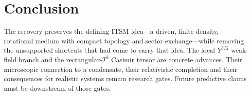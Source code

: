 \documentclass[11pt]{article}
\newcommand{\Tthree}{T^3}
\begin{document}
\section*{Conclusion}

The recovery preserves the defining ITSM idea---a driven, finite-density,
rotational medium with compact topology and sector exchange---while removing
the unsupported shortcuts that had come to carry that idea.  The local
$Y^{3/2}$ weak-field branch and the rectangular-$\Tthree$ Casimir tensor are
concrete advances.  Their microscopic connection to a condensate, their
relativistic completion and their consequences for realistic systems remain
research gates.  Future predictive claims must be downstream of those gates.
\end{document}
